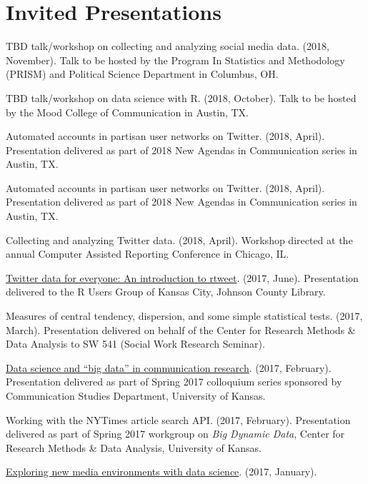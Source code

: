 \section{Invited Presentations}
  \begin{bibenum}
    \item[] TBD talk/workshop on collecting and analyzing social media data. (2018, November).
      Talk to be hosted by the Program In Statistics and Methodology (PRISM) and Political Science Department in Columbus, OH.
    \item[] TBD talk/workshop on data science with R. (2018, October).
      Talk to be hosted by the Mood College of Communication in Austin, TX.
    \item[] Automated accounts in partisan user networks on Twitter. (2018, April).
      Presentation delivered as part of 2018 New Agendas in Communication series in Austin, TX.
    \item[] Automated accounts in partisan user networks on Twitter. (2018, April).
      Presentation delivered as part of 2018 New Agendas in Communication series in Austin, TX.
    \item[] Collecting and analyzing Twitter data. (2018, April).
      Workshop directed at the annual Computer Assisted Reporting Conference in Chicago, IL.
    \item[] \href{https://mkearney.github.io/rusersKC}{Twitter data for everyone: An introduction to rtweet}. (2017, June).
      Presentation delivered to the R Users Group of Kansas City, Johnson County Library.
    \item[] Measures of central tendency, dispersion, and some simple statistical tests. (2017, March).
      Presentation delivered on behalf of the Center for Research Methods \& Data Analysis to SW 541 (Social Work Research Seminar).
    \item[]
      \href{https://mkearney.github.io/COLLOQUIUM/slides.html}{Data science and ``big data'' in communication research}. (2017, February).
      Presentation delivered as part of Spring 2017 colloquium series sponsored by Communication Studies Department, University of Kansas.
    \item[] Working with the NYTimes article search API. (2017, February).
      Presentation delivered as part of Spring 2017 workgroup on \textit{Big Dynamic Data},
      Center for Research Methods \& Data Analysis, University of Kansas.
    \item[]
      \href{https://mkearney.github.io/research_talk/pewtalk.html}{Exploring new media environments with data science}. (2017, January).

\end{bibenum}
